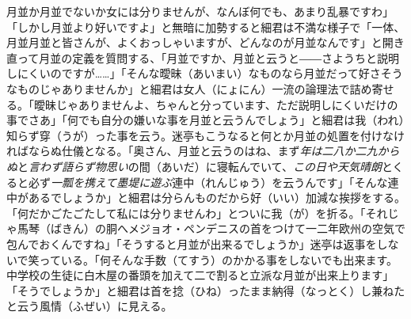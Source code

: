 \documentclass{book}
\begin{document}
月並か月並でないか女には分りませんが、なんぼ何でも、あまり乱暴ですわ」「しかし月並より好いですよ」と無暗に加勢すると細君は不満な様子で「一体、月並月並と皆さんが、よくおっしゃいますが、どんなのが月並なんです」と開き直って月並の定義を質問する、「月並ですか、月並と云うと――さようちと説明しにくいのですが\ldots{}\ldots{}」「そんな曖昧（あいまい）なものなら月並だって好さそうなものじゃありませんか」と細君は女人（にょにん）一流の論理法で詰め寄せる。「曖昧じゃありませんよ、ちゃんと分っています、ただ説明しにくいだけの事でさあ」「何でも自分の嫌いな事を月並と云うんでしょう」と細君は我（われ）知らず穿（うが）った事を云う。迷亭もこうなると何とか月並の処置を付けなければならぬ仕儀となる。「奥さん、月並と云うのはね、まず\emph{年は二八か二九からぬ}と\emph{言わず語らず物思い}の間（あいだ）に寝転んでいて、\emph{この日や天気晴朗}とくると必ず\emph{一瓢を携えて墨堤に遊ぶ}連中（れんじゅう）を云うんです」「そんな連中があるでしょうか」と細君は分らんものだから好（いい）加減な挨拶をする。「何だかごたごたして私には分りませんわ」とついに我（が）を折る。「それじゃ馬琴（ばきん）の胴へメジョオ・ペンデニスの首をつけて一二年欧州の空気で包んでおくんですね」「そうすると月並が出来るでしょうか」迷亭は返事をしないで笑っている。「何そんな手数（てすう）のかかる事をしないでも出来ます。中学校の生徒に白木屋の番頭を加えて二で割ると立派な月並が出来上ります」「そうでしょうか」と細君は首を捻（ひね）ったまま納得（なっとく）し兼ねたと云う風情（ふぜい）に見える。\\
\end{document}
